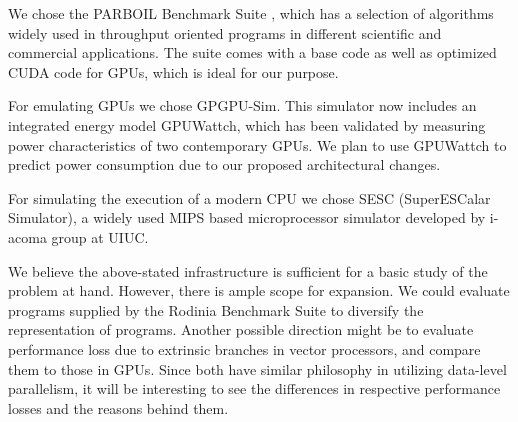 \par{
We chose the PARBOIL Benchmark Suite \cite{parboil-benchmark-suite}, which has a selection of algorithms widely used in throughput oriented programs in different scientific and commercial applications. The suite comes with a base code as well as optimized CUDA code for GPUs, which is ideal for our purpose.
}

\par{
For emulating GPUs we chose GPGPU-Sim\cite{gpgpu-sim}. This simulator now includes an integrated energy model GPUWattch, which has been validated by measuring power characteristics of two contemporary GPUs. We plan to use GPUWattch to predict power consumption due to our proposed architectural changes.
}

\par{
For simulating the execution of a modern CPU we chose SESC\cite{sesc-simulator} (SuperESCalar Simulator), a widely used MIPS based microprocessor simulator developed by i-acoma group at UIUC.
}

\par{We believe the above-stated infrastructure is sufficient for a basic study of the problem at hand. However, there is ample scope for expansion. We could evaluate programs supplied by the Rodinia Benchmark Suite\cite{rodinia-benchmark-suite} to diversify the representation of programs. Another possible direction might be to evaluate performance loss due to extrinsic branches in vector processors, and compare them to those in GPUs. Since both have similar philosophy in utilizing data-level parallelism, it will be interesting to see the differences in respective performance losses and the reasons behind them.}

